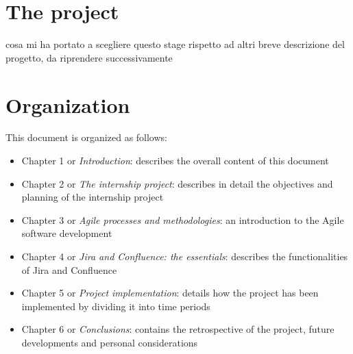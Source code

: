 \section{The project}
	cosa mi ha portato a scegliere questo stage rispetto ad altri
	breve descrizione del progetto, da riprendere successivamente

\section{Organization}
	This document is organized as follows:
	\begin{itemize}
		\item Chapter 1 or \textit{Introduction}: describes the overall content of this document
		\item Chapter 2 or \textit{The internship project}: describes in detail the objectives and planning of the internship project
		\item Chapter 3 or \textit{Agile processes and methodologies}: an introduction to the Agile software development
		\item Chapter 4 or \textit{Jira and Confluence: the essentials}: describes the functionalities of Jira and Confluence
		\item Chapter 5 or \textit{Project implementation}: details how the project has been implemented by dividing it into time periods
		\item Chapter 6 or \textit{Conclusions}: contains the retrospective of the project, future developments and personal considerations
	\end{itemize}
